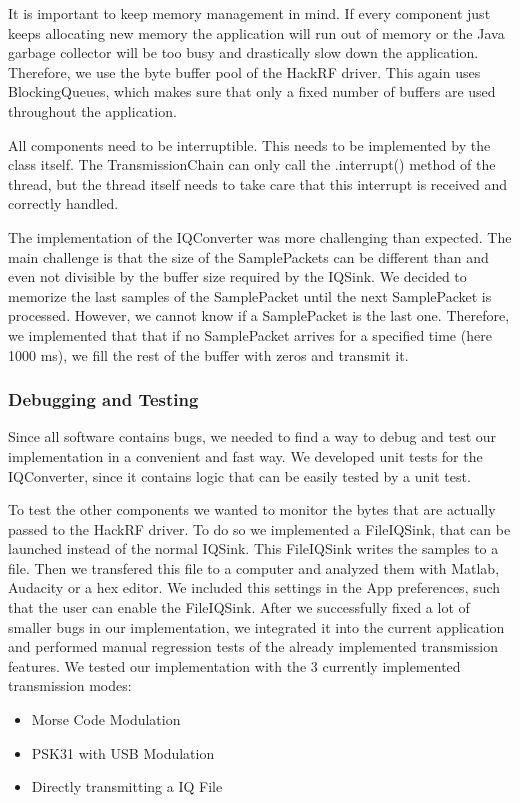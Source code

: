 It is important to keep memory management in mind. If every component just keeps allocating new memory the application will run out of memory or the Java garbage collector will be too busy and drastically slow down the application. Therefore, we use the byte buffer pool of the HackRF driver. This again uses BlockingQueues, which makes sure that only a fixed number of buffers are used throughout the application.  
	
All components need to be interruptible. This needs to be implemented by the class itself. The TransmissionChain can only call the .interrupt() method of the thread, but the thread itself needs to take care that this interrupt is received and correctly handled. 
	
The implementation of the IQConverter was more challenging than expected. The main challenge is that the size of the SamplePackets can be different than and even not divisible by the buffer size required by the IQSink. We decided to memorize the last samples of the SamplePacket until the next SamplePacket is processed. However, we cannot know if a SamplePacket is the last one. Therefore, we implemented that that if no SamplePacket arrives for a specified time (here 1000 ms), we fill the rest of the buffer with zeros and transmit it. 


\subsubsection{Debugging and Testing}
Since all software contains bugs, we needed to find a way to debug and test our implementation in a convenient and fast way. We developed unit tests for the IQConverter, since it contains logic that can be easily tested by a unit test. 

To test the other components we wanted to monitor the bytes that are actually passed to the HackRF driver. To do so we implemented a FileIQSink, that can be launched instead of the normal IQSink. This FileIQSink writes the samples to a file. Then we transfered this file to a computer and analyzed them with Matlab, Audacity or a hex editor. We included this settings in the App preferences, such that the user can enable the FileIQSink.
After we successfully fixed a lot of smaller bugs in our implementation, we integrated it into the current application and performed manual regression tests of the already implemented transmission features. We tested our implementation with the 3 currently implemented transmission modes: 
\begin{itemize}
	\item Morse Code Modulation
	\item PSK31 with USB Modulation
	\item Directly transmitting a IQ File 
\end{itemize}

